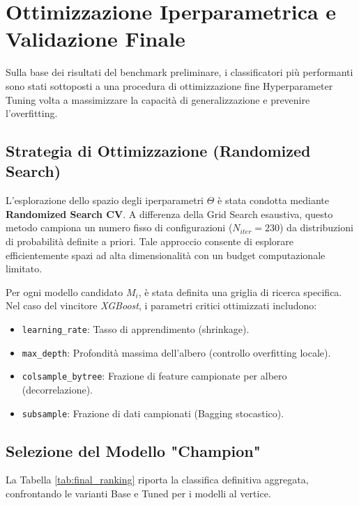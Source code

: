 \setcounter{figure}{0}
\renewcommand{\thefigure}{A.\arabic{figure}}
\setcounter{table}{0}
\renewcommand{\thetable}{A.\arabic{table}}
\section{Ottimizzazione Iperparametrica e Validazione Finale}
\label{app:hyperparam_tuning}

Sulla base dei risultati del benchmark preliminare, i classificatori più performanti sono stati sottoposti a una procedura di ottimizzazione fine Hyperparameter Tuning volta a massimizzare la capacità di generalizzazione e prevenire l'overfitting.

\subsection{Strategia di Ottimizzazione (Randomized Search)}

L'esplorazione dello spazio degli iperparametri \(\Theta\) è stata condotta mediante \textbf{Randomized Search CV}. A differenza della Grid Search esaustiva, questo metodo campiona un numero fisso di configurazioni (\(N_{iter}=230\)) da distribuzioni di probabilità definite a priori. Tale approccio consente di esplorare efficientemente spazi ad alta dimensionalità con un budget computazionale limitato.

Per ogni modello candidato \(M_i\), è stata definita una griglia di ricerca specifica. Nel caso del vincitore \textit{XGBoost}, i parametri critici ottimizzati includono:
\begin{itemize}
    \item \texttt{learning\_rate}: Tasso di apprendimento (shrinkage).
    \item \texttt{max\_depth}: Profondità massima dell'albero (controllo overfitting locale).
    \item \texttt{colsample\_bytree}: Frazione di feature campionate per albero (decorrelazione).
    \item \texttt{subsample}: Frazione di dati campionati (Bagging stocastico).
\end{itemize}

\subsection{Selezione del Modello "Champion"}

La Tabella \ref{tab:final_ranking} riporta la classifica definitiva aggregata, confrontando le varianti Base e Tuned per i modelli al vertice.

